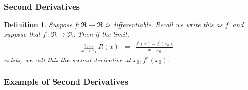 \documentclass{beamer}
\newtheorem{defn}{Definition}
\numberwithin{equation}{section}
\begin{document}
\begin{frame}
\frametitle{Second Derivatives}

\begin{defn} Suppose $f:\Re \rightarrow \Re$ is differentiable.  Recall we write this as $f^{'}$ and suppose that $f^{'}:\Re \rightarrow \Re$.  Then if the limit, 
\begin{eqnarray}
\lim_{x\rightarrow x_{0} } R(x) & = & \frac{f^{'}(x) - f^{'}(x_{0} ) } {x - x_{0} } \nonumber 
\end{eqnarray}
exists, we call this the \alert{second derivative} at $x_{0}, f^{''}(x_{0})$.  
\end{defn}

\end{frame}

\begin{frame}
\frametitle{Example of Second Derivatives}










\end{frame}
\end{document}
